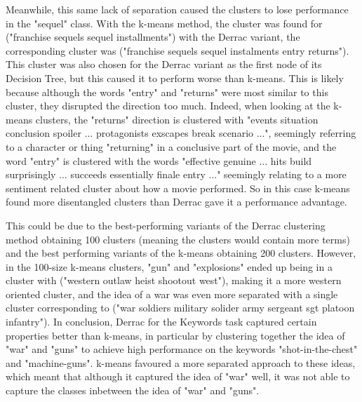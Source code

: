 


Meanwhile, this same lack of separation caused the clusters to lose performance in the "sequel" class. With the k-means method, the cluster was found for ("franchise sequels sequel installments") with the Derrac variant, the corresponding cluster was ("franchise sequels sequel instalments entry returns"). This cluster was also chosen for the Derrac variant as the first node of its Decision Tree, but this caused it to perform worse than k-means. This is likely because although the words "entry" and "returns" were most similar to this cluster, they disrupted the direction too much. Indeed, when looking at the k-means clusters, the "returns" direction is clustered with "events situation conclusion spoiler ... protagonists exscapes break scenario ...", seemingly referring to a character or thing "returning" in a conclusive part of the movie, and the word "entry" is clustered with the words "effective genuine ... hits build surprisingly ... succeeds essentially finale entry ..." seemingly relating to a more sentiment related cluster about how a movie performed. So in this case k-means found more disentangled clusters than Derrac gave it a performance advantage. 





This could be due to the best-performing variants of the Derrac clustering method obtaining 100 clusters (meaning the clusters would contain more terms) and the best performing variants of the k-means obtaining 200 clusters. However, in the 100-size k-means clusters, "gun" and "explosions" ended up being in a cluster with ("western outlaw heist shootout west"), making it a more western oriented cluster, and the idea of a war was even more separated with a single cluster corresponding to ("war soldiers military solider army sergeant sgt platoon infantry"). In conclusion, Derrac for the Keywords task captured certain properties better than k-means, in particular by clustering together the idea of "war" and "guns" to achieve high performance on the keywords "shot-in-the-chest" and "machine-guns". k-means favoured a more separated approach to these ideas, which meant that although it captured the idea of "war" well, it was not able to capture the classes inbetween the idea of "war" and "guns".

